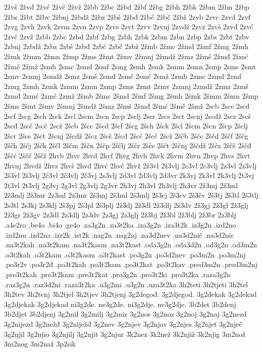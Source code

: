 {2žvš
2žvđ
2žvć
2žvč
2žvž
2žbb
2žbc
2žbd
2žbf
2žbg
2žbh
2žbk
2žbm
2žbn
2žbp
2žbs
2žbt
2žbv
2žbnj
2žbdž
2žbz
2žbš
2žbđ
2žbć
2žbč
2žbž
2zvb
2zvc
2zvd
2zvf
2zvg
2zvh
2zvk
2zvm
2zvn
2zvp
2zvs
2zvt
2zvv
2zvnj
2zvdž
2zvz
2zvš
2zvđ
2zvć
2zvč
2zvž
2zbb
2zbc
2zbd
2zbf
2zbg
2zbh
2zbk
2zbm
2zbn
2zbp
2zbs
2zbt
2zbv
2zbnj
2zbdž
2zbz
2zbš
2zbđ
2zbć
2zbč
2zbž
2žmb
2žmc
2žmd
2žmf
2žmg
2žmh
2žmk
2žmm
2žmn
2žmp
2žms
2žmt
2žmv
2žmnj
2žmdž
2žmz
2žmš
2žmđ
2žmć
2žmč
2žmž
2smb
2smc
2smd
2smf
2smg
2smh
2smk
2smm
2smn
2smp
2sms
2smt
2smv
2smnj
2smdž
2smz
2smš
2smđ
2smć
2smč
2smž
2zmb
2zmc
2zmd
2zmf
2zmg
2zmh
2zmk
2zmm
2zmn
2zmp
2zms
2zmt
2zmv
2zmnj
2zmdž
2zmz
2zmš
2zmđ
2zmć
2zmč
2zmž
2šmb
2šmc
2šmd
2šmf
2šmg
2šmh
2šmk
2šmm
2šmn
2šmp
2šms
2šmt
2šmv
2šmnj
2šmdž
2šmz
2šmš
2šmđ
2šmć
2šmč
2šmž
2scb
2scc
2scd
2scf
2scg
2sch
2sck
2scl
2scm
2scn
2scp
2sclj
2scr
2scs
2sct
2scnj
2scdž
2scz
2scš
2scđ
2scć
2scč
2scž
2šcb
2šcc
2šcd
2šcf
2šcg
2šch
2šck
2šcl
2šcm
2šcn
2šcp
2šclj
2šcr
2šcs
2šct
2šcnj
2šcdž
2šcz
2šcš
2šcđ
2šcć
2šcč
2šcž
2ščb
2ščc
2ščd
2ščf
2ščg
2ščh
2ščj
2ščk
2ščl
2ščm
2ščn
2ščp
2ščlj
2ščr
2ščs
2ščt
2ščnj
2ščdž
2ščz
2ščš
2ščđ
2ščć
2ščč
2ščž
2hvb
2hvc
2hvd
2hvf
2hvg
2hvh
2hvk
2hvm
2hvn
2hvp
2hvs
2hvt
2hvnj
2hvdž
2hvz
2hvš
2hvđ
2hvć
2hvč
2hvž
2ž3vl
2ž3vlj
2c3vl
2c3vlj
2z3vl
2z3vlj
2š3vl
2š3vlj
2č3vl
2č3vlj
2č3vj
2s3vlj
2d3vl
2d3vlj
2d3vr
2k3vj
2k3vl
2k3vlj
2t3vj
2t3vl
2t3vlj
2g3vj
2g3vl
2g3vlj
2g3vr
2h3vj
2h3vl
2h3vlj
2h3vr
2ž3mj
2ž3ml
2ž3mlj
2ž3mr
2z3ml
2z3mr
2š3mj
2š3ml
2š3mlj
2š3cj
2š3cv
2š3čv
2š3tj
2š3tl
2š3tlj
2s3tl
2s3kj
2s3klj
2š3pj
2š3pl
2š3plj
2ž3dj
2ž3dl
2ž3dlj
2ž3dv
2ž3gj
2ž3gl
2ž3glj
2ž3gr
2ž3gv
2z3dl
2z3dlj
2z3dv
2z3gj
2z3glj
2ž3bj
2ž3bl
2ž3blj
2ž3br
2z3blj
.a4e2ro
.be4o
.bi4o
.ge4o
.za3g2n
.za3t2ka
.iza3g2n
.iza3t2k
.iz3g2n
.izd2no
.izd2nu
.izd2na
.izr2k
.ist2k
.nag2n
.nag2nj
.na3d2nev
.na3d2nič
.na3d2nic
.na3t2kah
.na3t2kam
.na3t2kasm
.na3t2kast
.oda3g2n
.oda3d2n
.od3g2n
.od3m2n
.o3t2kah
.o3t2kam
.o3t2kasm
.o3t2kast
.po3g2n
.po3d2nev
.po3m2n
.po3m2nj
.po3r2v
.po3r2đ
.po3t2kah
.po3t2kam
.po3t2kat
.po3t2kav
.pred3m2n
.pred3m2nj
.pre3t2kah
.pre3t2kam
.pre3t2kat
.pro3g2n
.pro3t2ki
.pro3t2ka
.raza3g2n
.raz3g2n
.raz3d2ni
.raza3t2ka
.u3g2mi
.u3g2n
.uza3t2ka
3h2teti
3h2tjeti
3h2tel
3h2tev
3h2tenj
3h2tjel
3h2tjev
3h2tjenj
3g2degod.
3g2djegod.
3g2dekak
3g2dekad
3g2djekak
3g2djekad
ni3g2de.
ne3g2de.
ni3g2dje.
ne3g2dje.
3b2det
3b2denj
3b2djet
3b2djenj
3g2mil
3g2milj
3g2miz
3g2nos
3g2noz
3g2noj
3g2naj
3g2nezd
3g2nijezd
3g2nežđ
3g2niježđ
3g2nev
3g2njev
3g2njav
3g2njes
3g2njet
3g2nječ
3g2njil
3g2njio
3g2njilj
3g2njit
3g2njur
3k2nez
3k2než
3k2njiž
3k2njig
3m2nož
3m2nog
3m2naž
3p2sik
}
